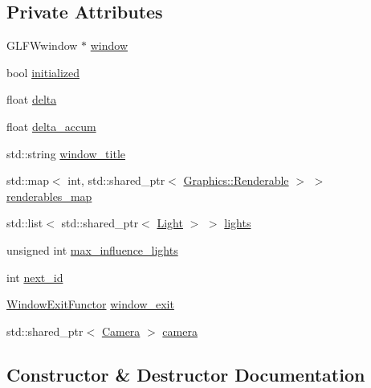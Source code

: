 \subsection*{Private Attributes}
\begin{DoxyCompactItemize}
\item 
G\+L\+F\+Wwindow $\ast$ \hyperlink{class_graphics_1_1_graphics_system_a4430d61bb3fd528b617e8fea26744a8c}{window}
\item 
bool \hyperlink{class_graphics_1_1_graphics_system_a7228e859a8b7da7d9cbc3e151ab2df72}{initialized}
\item 
float \hyperlink{class_graphics_1_1_graphics_system_ac2af4e3929076d67c1ac1a891a42d29f}{delta}
\item 
float \hyperlink{class_graphics_1_1_graphics_system_aeedd2deb72e532dc037abd30198b598a}{delta\+\_\+accum}
\item 
std\+::string \hyperlink{class_graphics_1_1_graphics_system_a7b543ac0f4323ec286519a3dfef0df1c}{window\+\_\+title}
\item 
std\+::map$<$ int, std\+::shared\+\_\+ptr$<$ \hyperlink{class_graphics_1_1_renderable}{Graphics\+::\+Renderable} $>$ $>$ \hyperlink{class_graphics_1_1_graphics_system_a5dab770243e04860495f894184ef63bb}{renderables\+\_\+map}
\item 
std\+::list$<$ std\+::shared\+\_\+ptr$<$ \hyperlink{class_graphics_1_1_light}{Light} $>$ $>$ \hyperlink{class_graphics_1_1_graphics_system_abae3d590c5e9f0f34f50160e5edda614}{lights}
\item 
unsigned int \hyperlink{class_graphics_1_1_graphics_system_a9792bef5166bb5e92305f0ef53582f7f}{max\+\_\+influence\+\_\+lights}
\item 
int \hyperlink{class_graphics_1_1_graphics_system_a950f878ddd2ca0b13a715f4300447903}{next\+\_\+id}
\item 
\hyperlink{class_graphics_1_1_window_exit_functor}{Window\+Exit\+Functor} \hyperlink{class_graphics_1_1_graphics_system_ac31d552052e7afd10043456ee9393e1a}{window\+\_\+exit}
\item 
std\+::shared\+\_\+ptr$<$ \hyperlink{class_graphics_1_1_camera}{Camera} $>$ \hyperlink{class_graphics_1_1_graphics_system_a6d00900277f81eba008fe030ee6bcb2e}{camera}
\end{DoxyCompactItemize}


\subsection{Constructor \& Destructor Documentation}
\hypertarget{class_graphics_1_1_graphics_system_a748459586ae5ea2aa8721dddb8660de6}{}
